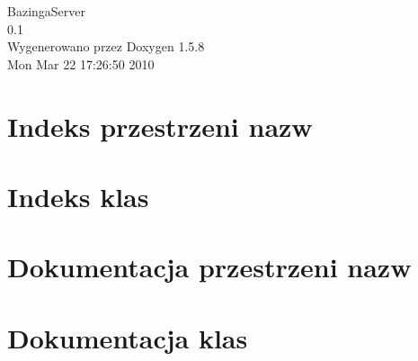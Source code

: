 \documentclass[a4paper]{book}
\begin{document}
\begin{titlepage}
\vspace*{7cm}
\begin{center}
{\Large BazingaServer \\[1ex]\large 0.1 }\\
\vspace*{1cm}
{\large Wygenerowano przez Doxygen 1.5.8}\\
\vspace*{0.5cm}
{\small Mon Mar 22 17:26:50 2010}\\
\end{center}
\end{titlepage}
\clearemptydoublepage
{}
\tableofcontents
\clearemptydoublepage
{}
\chapter{Indeks przestrzeni nazw}

\chapter{Indeks klas}

\chapter{Dokumentacja przestrzeni nazw}



\chapter{Dokumentacja klas}













\printindex
\end{document}
